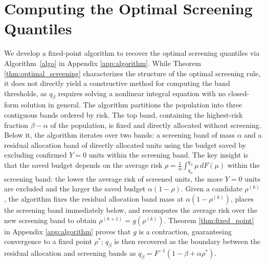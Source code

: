 \section{Computing the Optimal Screening Quantiles}
\label{sec:algorithm}

We develop a fixed-point algorithm to recover the optimal screening quantiles via Algorithm~\ref{algo} in Appendix \ref{app:algorithm}. While Theorem \ref{thm:optimal_screening} characterizes the structure of the optimal screening rule, it does not directly yield a constructive method for computing the band thresholds, as $q_\beta$ requires solving a nonlinear integral equation with no closed-form solution in general. The algorithm partitions the population into three contiguous bands ordered by risk. The top band, containing the highest-risk fraction $\beta - \alpha$ of the population, is fixed and directly allocated without screening. Below it, the algorithm iterates over two bands: a screening band of mass $\alpha$ and a residual allocation band of directly allocated units using the budget saved by excluding confirmed $Y=0$ units within the screening band. The key insight is that the saved budget depends on the average risk $\rho = \frac{1}{\alpha}\int_{q_\alpha}^{q_\beta}\mu\,dF(\mu)$ within the screening band: the lower the average risk of screened units, the more $Y=0$ units are excluded and the larger the saved budget $\alpha(1-\rho)$. Given a candidate $\rho^{(k)}$, the algorithm fixes the residual allocation band mass at $\alpha(1-\rho^{(k)})$, places the screening band immediately below, and recomputes the average risk over the new screening band to obtain $\rho^{(k+1)} = g(\rho^{(k)})$. Theorem \ref{thm:fixed_point} in Appendix \ref{app:algorithm} proves that $g$ is a contraction, guaranteeing convergence to a fixed point $\rho^*$; $q_\beta$ is then recovered as the boundary between the residual allocation and screening bands as $q_\beta = F^{-1}(1-\beta + \alpha\rho^*)$.




